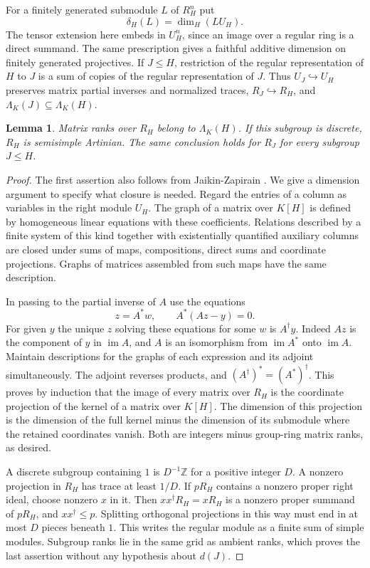 \documentclass[11pt,a4paper,reqno]{amsart}
\numberwithin{equation}{section}
\newtheorem{lemma}[theorem]{Lemma}
\theoremstyle{remark}
\newcommand{\Z}{\mathbb Z}
\newcommand{\im}{\operatorname{im}}
\begin{document}
For a finitely generated submodule \(L\) of \(R_H^n\) put
\[
       \delta_H(L)=\dim_H(LU_H).
\]
The tensor extension here embeds in \(U_H^n\), since an image over a regular ring is a direct summand. The same prescription gives a faithful additive dimension on finitely generated projectives. If \(J\le H\), restriction of the regular representation of \(H\) to \(J\) is a sum of copies of the regular representation of \(J\). Thus \(U_J\hookrightarrow U_H\) preserves matrix partial inverses and normalized traces, \(R_J\hookrightarrow R_H\), and \(\Lambda_K(J)\subseteq\Lambda_K(H)\).

\begin{lemma}\label{lem:grid}
Matrix ranks over \(R_H\) belong to \(\Lambda_K(H)\). If this subgroup is discrete, \(R_H\) is semisimple Artinian. The same conclusion holds for \(R_J\) for every subgroup \(J\le H\).
\end{lemma}
\begin{proof}
The first assertion also follows from Jaikin-Zapirain \cite[Corollary~6.2]{Jaikin}. We give a dimension argument to specify what closure is needed. Regard the entries of a column as variables in the right module \(U_H\). The graph of a matrix over \(K[H]\) is defined by homogeneous linear equations with these coefficients. Relations described by a finite system of this kind together with existentially quantified auxiliary columns are closed under sums of maps, compositions, direct sums and coordinate projections. Graphs of matrices assembled from such maps have the same description.

In passing to the partial inverse of \(A\) use the equations
\[
        z=A^*w,\qquad A^*(Az-y)=0 .
\]
For given \(y\) the unique \(z\) solving these equations for some \(w\) is \(A^\dagger y\). Indeed \(Az\) is the component of \(y\) in \(\im A\), and \(A\) is an isomorphism from \(\im A^*\) onto \(\im A\). Maintain descriptions for the graphs of each expression and its adjoint simultaneously. The adjoint reverses products, and \((A^\dagger)^*=(A^*)^\dagger\). This proves by induction that the image of every matrix over \(R_H\) is the coordinate projection of the kernel of a matrix over \(K[H]\). The dimension of this projection is the dimension of the full kernel minus the dimension of its submodule where the retained coordinates vanish. Both are integers minus group-ring matrix ranks, as desired.

A discrete subgroup containing \(1\) is \(D^{-1}\Z\) for a positive integer \(D\). A nonzero projection in \(R_H\) has trace at least \(1/D\). If \(pR_H\) contains a nonzero proper right ideal, choose nonzero \(x\) in it. Then \(xx^\dagger R_H=xR_H\) is a nonzero proper summand of \(pR_H\), and \(xx^\dagger\le p\). Splitting orthogonal projections in this way must end in at most \(D\) pieces beneath \(1\). This writes the regular module as a finite sum of simple modules. Subgroup ranks lie in the same grid as ambient ranks, which proves the last assertion without any hypothesis about \(d(J)\).
\end{proof}
\end{document}
